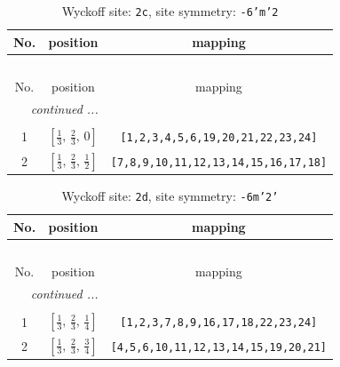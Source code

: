 \documentclass[fleqn,8pt]{jsarticle}
\begin{document}
\renewcommand{\arraystretch}{1.2}
\begin{longtable}{ccc}
\caption{Wyckoff site: {\tt 2c}, site symmetry: {\tt -6'm'2}}
 \\
 \hline \hline
No. & position & mapping \\ \hline \endfirsthead

\multicolumn{2}{l}{\tablename\ \thetable{}} \\
 \hline \hline
No. & position & mapping \\ \hline \endhead

 \hline \hline
\multicolumn{2}{r}{\footnotesize\it continued ...} \\ \endfoot

 \hline \hline
\multicolumn{2}{r}{} \\ \endlastfoot

1 & $\left[ \frac{1}{3},\, \frac{2}{3},\, 0 \right]$ & {\tt [1,2,3,4,5,6,19,20,21,22,23,24]} \\ \hline
2 & $\left[ \frac{1}{3},\, \frac{2}{3},\, \frac{1}{2} \right]$ & {\tt [7,8,9,10,11,12,13,14,15,16,17,18]} \\
\end{longtable}
\renewcommand{\arraystretch}{1.2}
\begin{longtable}{ccc}
\caption{Wyckoff site: {\tt 2d}, site symmetry: {\tt -6m'2'}}
 \\
 \hline \hline
No. & position & mapping \\ \hline \endfirsthead

\multicolumn{2}{l}{\tablename\ \thetable{}} \\
 \hline \hline
No. & position & mapping \\ \hline \endhead

 \hline \hline
\multicolumn{2}{r}{\footnotesize\it continued ...} \\ \endfoot

 \hline \hline
\multicolumn{2}{r}{} \\ \endlastfoot

1 & $\left[ \frac{1}{3},\, \frac{2}{3},\, \frac{1}{4} \right]$ & {\tt [1,2,3,7,8,9,16,17,18,22,23,24]} \\ \hline
2 & $\left[ \frac{1}{3},\, \frac{2}{3},\, \frac{3}{4} \right]$ & {\tt [4,5,6,10,11,12,13,14,15,19,20,21]} \\
\end{longtable}
\renewcommand{\arraystretch}{1.2}
\end{document}
